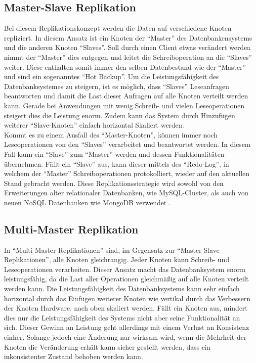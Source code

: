 \documentclass[a4paper,11pt,oneside,%
headsepline,												%
footsepline,												%
bibtotocnumbered									%
]{scrreprt}
\begin{document}
\subsection{Master-Slave Replikation}
Bei diesem Replikationskonzept werden die Daten auf verschiedene Knoten repliziert. In diesem Ansatz ist ein Knoten der \enquote{Master} des Datenbankensystems und die anderen Knoten \enquote{Slaves}. Soll durch einen Client etwas verändert werden nimmt der \enquote{Master} dies entgegen und leitet die Schreiboperation an die \enquote{Slaves} weiter. Diese enthalten somit immer den selben Datenbestand wie der \enquote{Master} und sind ein sogenanntes \enquote{Hot Backup}. Um die Leistungsfähigkeit des Datenbanksystemes zu steigern, ist es möglich, dass \enquote{Slaves} Leseanfragen beantworten und damit die Last dieser Anfragen auf alle Knoten verteilt werden kann. Gerade bei Anwendungen mit wenig Schreib- und vielen Leseoperationen steigert dies die Leistung enorm. Zudem kann das System durch Hinzufügen weiterer \enquote{Slave-Knoten} einfach horizontal Skaliert werden.\\

Kommt es zu einem Ausfall des \enquote{Master-Knoten}, können immer noch Leseoperationen von den \enquote{Slaves} verarbeitet und beantwortet werden. In diesem Fall kann ein \enquote{Slave} zum \enquote{Master} werden und dessen Funktionalitäten übernehmen. Fällt ein \enquote{Slave} aus, kann dieser mittels des \enquote{Redo-Log}, in welchem der \enquote{Master} Schreiboperationen protokolliert, wieder auf den aktuellen Stand gebracht werden. Diese Replikationsstrategie wird sowohl von den Erweiterungen alter relationaler Datenbanken, wie MySQL-Cluster, als auch von neuen NoSQL Datenbanken wie MongoDB verwendet \autocite[40]{Fowler2013}.

\subsection{Multi-Master Replikation}
In \enquote{Multi-Master Replikationen} sind, im Gegensatz zur \enquote{Master-Slave Replikationen}, alle Knoten gleichrangig. Jeder Knoten kann Schreib- und Leseoperationen verarbeiten. Dieser Ansatz macht das Datenbanksystem enorm leistungsfähig, da die Last aller Operationen gleichmäßig auf alle Knoten verteilt werden kann. Die Leistungsfähigkeit des Datenbanksystems kann sehr einfach horizontal durch das Einfügen weiterer Knoten wie vertikal durch das Verbessern der Knoten Hardware, nach oben skaliert werden. Fällt ein Knoten aus, mindert dies nur die Leistungsfähigkeit des Systems nicht aber seine Funktionalität an sich. Dieser Gewinn an Leistung geht allerdings mit einem Verlust an Konsistenz einher. Solange jedoch eine Änderung nur wirksam wird, wenn die Mehrheit der Knoten die Veränderung erhält kann sicher gestellt werden, dass ein inkonsistenter Zustand behoben werden kann\autocite[42]{Fowler2013}.
\end{document}
